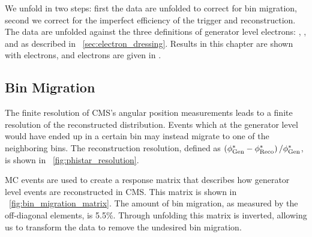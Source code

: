We unfold in two steps: first the data are unfolded to correct for bin
migration, second we correct for the imperfect efficiency of the trigger and
reconstruction. The data are unfolded against the three definitions of
generator level electrons: \born, \dressed, and \bare as described in
\SEC~\ref{sec:electron_dressing}. Results in this chapter are shown with
\dressed electrons, \born and \bare electrons are given in \APP{}.

\subsection{Bin Migration}
\label{ssec:bin_migration}

The finite resolution of CMS's angular position measurements leads to a finite
resolution of the reconstructed \phistar distribution. Events which at the
generator level would have ended up in a certain \phistar bin may instead
migrate to one of the neighboring bins. The \phistar reconstruction resolution,
defined as $\left( \phi^{*}_{\text{Gen}} - \phi^{*}_{\text{Reco}} \right) / \phi^{*}_{\text{Gen}}$, is shown
in \FIG~\ref{fig:phistar_resolution}.

MC events are used to create a response matrix that describes how generator
level events are reconstructed in CMS. This matrix is shown in
\FIG~\ref{fig:bin_migration_matrix}. The amount of bin migration, as measured
by the off-diagonal elements, is 5.5\%. Through unfolding this matrix is
inverted, allowing us to transform the data to remove the undesired bin
migration.

